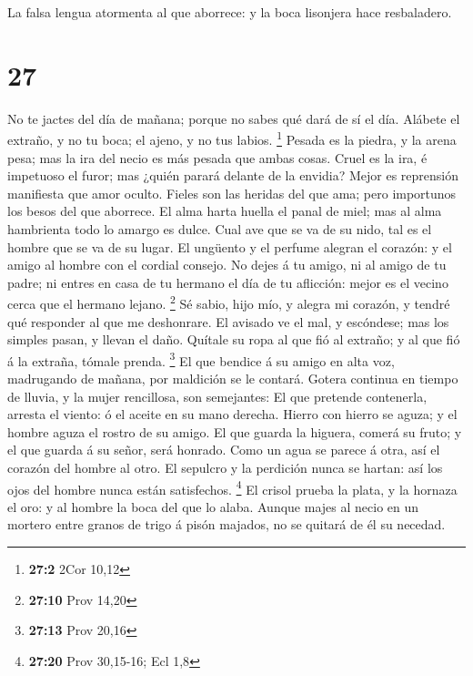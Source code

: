  La falsa lengua atormenta al que aborrece: y la boca
lisonjera hace resbaladero.

\hypertarget{section-26}{%
\section{27}\label{section-26}}

 No te jactes del día de mañana; porque no sabes qué dará de
sí el día.  Alábete el extraño, y no tu boca; el ajeno, y no
tus labios. \footnote{\textbf{27:2} 2Cor 10,12}  Pesada es
la piedra, y la arena pesa; mas la ira del necio es más pesada que ambas
cosas.  Cruel es la ira, é impetuoso el furor; mas ¿quién
parará delante de la envidia?  Mejor es reprensión
manifiesta que amor oculto.  Fieles son las heridas del que
ama; pero importunos los besos del que aborrece.  El alma
harta huella el panal de miel; mas al alma hambrienta todo lo amargo es
dulce.  Cual ave que se va de su nido, tal es el hombre que
se va de su lugar.  El ungüento y el perfume alegran el
corazón: y el amigo al hombre con el cordial consejo.  No
dejes á tu amigo, ni al amigo de tu padre; ni entres en casa de tu
hermano el día de tu aflicción: mejor es el vecino cerca que el hermano
lejano. \footnote{\textbf{27:10} Prov 14,20}  Sé sabio,
hijo mío, y alegra mi corazón, y tendré qué responder al que me
deshonrare.  El avisado ve el mal, y escóndese; mas los
simples pasan, y llevan el daño.  Quítale su ropa al que
fió al extraño; y al que fió á la extraña, tómale prenda. \footnote{\textbf{27:13}
  Prov 20,16}  El que bendice á su amigo en alta voz,
madrugando de mañana, por maldición se le contará.  Gotera
continua en tiempo de lluvia, y la mujer rencillosa, son semejantes:
 El que pretende contenerla, arresta el viento: ó el aceite
en su mano derecha.  Hierro con hierro se aguza; y el
hombre aguza el rostro de su amigo.  El que guarda la
higuera, comerá su fruto; y el que guarda á su señor, será honrado.
 Como un agua se parece á otra, así el corazón del hombre
al otro.  El sepulcro y la perdición nunca se hartan: así
los ojos del hombre nunca están satisfechos. \footnote{\textbf{27:20}
  Prov 30,15-16; Ecl 1,8}  El crisol prueba la plata, y la
hornaza el oro: y al hombre la boca del que lo alaba. 
Aunque majes al necio en un mortero entre granos de trigo á pisón
majados, no se quitará de él su necedad.

